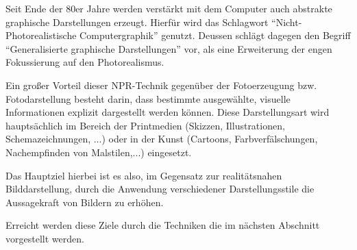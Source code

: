 Seit Ende der 80er Jahre werden verstärkt mit dem Computer auch abstrakte 
graphische Darstellungen erzeugt. Hierfür wird das Schlagwort 
"`Nicht-Photorealistische Computergraphik"' genutzt. Deussen 
\cite{Deussen2001} schlägt dagegen den Begriff "`Generalisierte graphische 
Darstellungen"' vor, als eine Erweiterung der engen Fokussierung auf den 
Photorealismus. \par Ein großer Vorteil dieser NPR-Technik gegenüber der 
Fotoerzeugung bzw. Fotodarstellung besteht darin, dass bestimmte 
ausgewählte, visuelle Informationen explizit dargestellt werden können. 
Diese Darstellungsart wird hauptsächlich im Bereich der Printmedien 
(Skizzen, Illustrationen, Schemazeichnungen, ...) oder in der Kunst 
(Cartoons, Farbverfälschungen, Nachempfinden von Malstilen,...) eingesetzt. 
\par Das Hauptziel hierbei ist es also, im Gegensatz zur realitätsnahen 
Bilddarstellung, durch die Anwendung verschiedener Darstellungsstile die 
Aussagekraft von Bildern zu erhöhen.
\par Erreicht werden diese Ziele durch die Techniken die im nächsten Abschnitt
vorgestellt werden.
